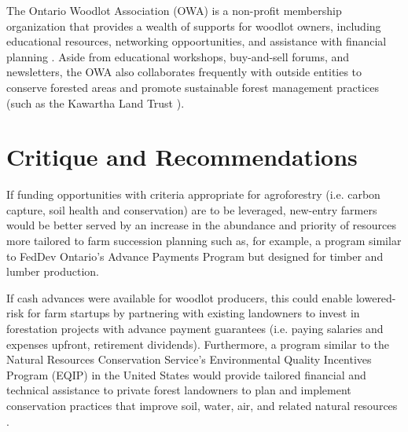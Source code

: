 \documentclass{report}
\begin{document}
\hspace{24pt}The Ontario Woodlot Association (OWA) is a non-profit membership organization that provides a wealth of supports for woodlot owners, including educational resources, networking oppoortunities, and assistance with financial planning \parencite{onwoodlot}. Aside from educational workshops, buy-and-sell forums, and newsletters, the OWA also collaborates frequently with outside entities to conserve forested areas and promote sustainable forest management practices (such as the Kawartha Land Trust \parencite{kawartha}).

\section{Critique and Recommendations}

\hspace{24pt}If funding opportunities with criteria appropriate for agroforestry (i.e. carbon capture, soil health and conservation) are to be leveraged, new-entry farmers would be better served by an increase in the abundance and priority of resources more tailored to farm succession planning such as, for example, a program similar to FedDev Ontario's Advance Payments Program but designed for timber and lumber production.

\hspace{24pt}If cash advances were available for woodlot producers, this could enable lowered-risk for farm startups by partnering with existing landowners to invest in forestation projects with advance payment guarantees (i.e. paying salaries and expenses upfront, retirement dividends). Furthermore, a program similar to the Natural Resources Conservation Service's Environmental Quality Incentives Program (EQIP) in the United States would provide tailored financial and technical assistance to private forest landowners to plan and implement conservation practices that improve soil, water, air, and related natural resources \parencite{eqip}.

\end{document}
